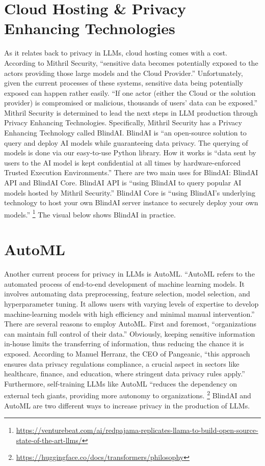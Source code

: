 \documentclass[
]{book}
\begin{document}
\hypertarget{cloud-hosting-privacy-enhancing-technologies}{%
\section{Cloud Hosting \& Privacy Enhancing Technologies}\label{cloud-hosting-privacy-enhancing-technologies}}

As it relates back to privacy in LLMs, cloud hosting comes with a cost. According to Mithril Security, ``sensitive data becomes potentially exposed to the actors providing those large models and the Cloud Provider.'' Unfortunately, given the current processes of these systems, sensitive data being potentially exposed can happen rather easily. ``If one actor (either the Cloud or the solution provider) is compromised or malicious, thousands of users' data can be exposed.'' Mithril Security is determined to lead the next steps in LLM production through Privacy Enhancing Technologies. Specifically, Mithril Security has a Privacy Enhancing Technology called BlindAI. BlindAI is ``an open-source solution to query and deploy AI models while guaranteeing data privacy. The querying of models is done via our easy-to-use Python library. How it works is ``data sent by users to the AI model is kept confidential at all times by hardware-enforced Trusted Execution Environments.'' There are two main uses for BlindAI: BlindAI API and BlindAI Core. BlindAI API is ``using BlindAI to query popular AI models hosted by Mithril Security.'' BlindAI Core is ``using BlindAI's underlying technology to host your own BlindAI server instance to securely deploy your own models.'' \footnote{\url{https://venturebeat.com/ai/redpajama-replicates-llama-to-build-open-source-state-of-the-art-llms/}} The visual below shows BlindAI in practice.

\hypertarget{automl}{%
\section{AutoML}\label{automl}}

Another current process for privacy in LLMs is AutoML. ``AutoML refers to the automated process of end-to-end development of machine learning models. It involves automating data preprocessing, feature selection, model selection, and hyperparameter tuning. It allows users with varying levels of expertise to develop machine-learning models with high efficiency and minimal manual intervention.'' There are several reasons to employ AutoML. First and foremost, ``organizations can maintain full control of their data.'' Obviously, keeping sensitive information in-house limits the transferring of information, thus reducing the chance it is exposed. According to Manuel Herranz, the CEO of Pangeanic, ``this approach ensures data privacy regulations compliance, a crucial aspect in sectors like healthcare, finance, and education, where stringent data privacy rules apply.'' Furthermore, self-training LLMs like AutoML ``reduces the dependency on external tech giants, providing more autonomy to organizations. \footnote{\url{https://huggingface.co/docs/transformers/philosophy}} BlindAI and AutoML are two different ways to increase privacy in the production of LLMs.
\end{document}
